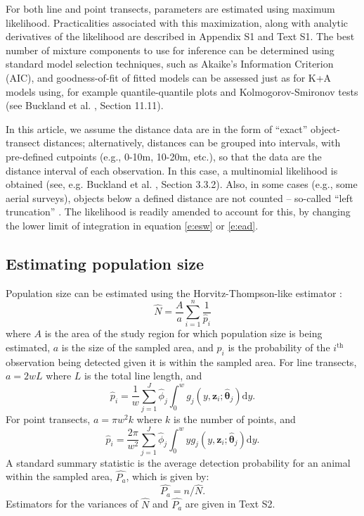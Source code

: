 \documentclass[10pt]{article}
\begin{document}
For both line and point transects, parameters are estimated using maximum likelihood. Practicalities associated with this maximization, along with analytic derivatives of the likelihood are described in Appendix S1 and Text S1.  The best number of mixture components to use for inference can be determined using standard model selection techniques, such as Akaike's Information Criterion (AIC), and goodness-of-fit of fitted models can be assessed just as for K+A models using, for example quantile-quantile plots and Kolmogorov-Smironov tests (see Buckland et al. \cite{Buckland:2004ts}, Section 11.11).

In this article, we assume the distance data are in the form of ``exact'' object-transect distances; alternatively, distances can be grouped into intervals, with pre-defined cutpoints (e.g., 0-10m, 10-20m, etc.), so that the data are the distance interval of each observation.  In this case, a multinomial likelihood is obtained (see, e.g. Buckland et al. \cite{Buckland:2001vm}, Section 3.3.2).  Also, in some cases (e.g., some aerial surveys), objects below a defined distance are not counted -- so-called ``left truncation'' \cite[Section 4.3.2]{Buckland:2001vm}.  The likelihood is readily amended to account for this, by changing the lower limit of integration in equation \eqref{e:esw} or \eqref{e:ead}.

\subsection*{Estimating population size}

Population size can be estimated using the Horvitz-Thompson-like estimator \cite{Marques:2003vb}:
\begin{equation}
\label{e:popsize}
\hat{N}=\frac{A}{a}\sum_{i=1}^n \frac{1}{\hat {p}_i}
\end{equation}
where $A$ is the area of the study region for which population size is being estimated, $a$ is the size of the sampled area, and $p_i$ is the probability of the $i^\text{th}$ observation being detected given it is within the sampled area.  For line transects, $a=2wL$ where $L$ is the total line length, and 
\begin{equation*}
\hat{p}_i = \frac{1}{w} \sum_{j=1}^J \hat{\phi}_j \int_0^w  g_j(y,\mathbf{z}_{i}; \mathbf{\hat{\theta}}_j) \text{d}y.
\end{equation*}
For point transects, $a=\pi w^2 k$ where $k$ is the number of points, and 
\begin{equation*}
\hat{p}_i = \frac{2\pi}{w^2} \sum_{j=1}^J \hat{\phi}_j \int_0^w  y g_j(y,\mathbf{z}_{i}; \mathbf{\hat{\theta}
}_j) \text{d}y.
\end{equation*}
A standard summary statistic is the average detection probability for an animal within the sampled area, $\hat{P_a}$, which is given by:
\begin{equation*}
\hat{P_a} = n/\hat{N}.
\end{equation*}
Estimators for the variances of $\hat{N}$ and $\hat{P_a}$ are given in Text S2.
\end{document}
